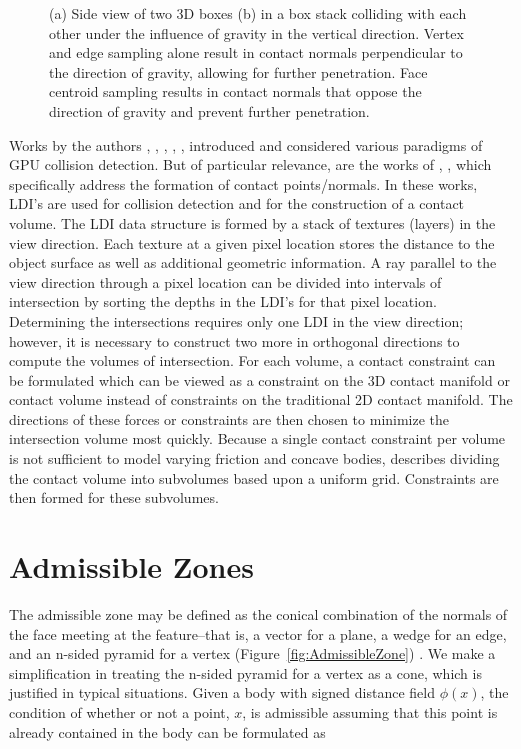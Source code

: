 \documentclass[9pt,twocolumn]{article}
\begin{document}
\begin{figure}[ht]
{	\label{fig:subfig2}
}
\caption{(a) Side view of two 3D boxes (b) in a box stack colliding with each other under the influence of gravity in the vertical direction. Vertex and edge sampling alone result in contact normals perpendicular to the direction of gravity, allowing for further penetration. Face centroid sampling results in contact normals that oppose the direction of gravity and prevent further penetration. }
\label{Problem1}
\end{figure}

Works by the authors \cite{Vassilev}, \cite{Heidelberger}, \cite{Wong}, \cite{Sud}, \cite{Faure}, \cite{Allard} introduced and considered various paradigms of GPU collision detection. But of particular relevance, are the works of \cite{Faure}, \cite{Allard}, which specifically address the formation of contact points/normals. In these works,  LDI's are used for collision detection and for the construction of a contact volume. The LDI data structure is formed by a stack of textures (layers) in the view direction. Each texture at a given pixel location stores the distance to the object surface as well as additional geometric information. A ray parallel to the view direction through a pixel location can be divided into intervals of intersection by sorting the depths in the LDI's for that pixel location. Determining the intersections requires only one LDI in the view direction; however, it is necessary to construct two more in orthogonal directions to compute the volumes of intersection. For each volume, a contact constraint can be formulated which can be viewed as a constraint on the 3D contact manifold or contact volume instead of constraints on the traditional 2D contact manifold. The directions of these forces or constraints are then chosen to minimize the intersection volume most quickly. Because a single contact constraint per volume is not sufficient to model varying friction and concave bodies, \cite{Allard} describes dividing the contact volume into subvolumes based upon a uniform grid. Constraints are then formed for these subvolumes. 

\section{Admissible Zones}

The admissible zone may be defined as the conical combination of the normals of the face meeting at the feature--that is, a vector for a plane, a wedge for an edge, and an n-sided pyramid for a vertex (Figure~\ref{fig:AdmissibleZone}) \cite{English}. We make a simplification in treating the n-sided pyramid for a vertex as a cone, which is justified in typical situations. Given a body with signed distance field $\phi(x)$, the condition of whether or not a point, $x$, is admissible assuming that this point is already contained in the body can be formulated as 
\end{document}
